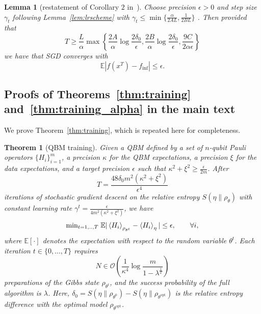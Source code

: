 \documentclass[
    aps,
    prx,
    onecolumn
]{revtex4-2}
\newtheorem{theorem}{Theorem}
\newtheorem{lemma}{Lemma}
\begin{document}
\begin{lemma}[restatement of Corollary $2$ in~\cite{Khaled2020}]
\label{lem:sgd_conv_2}
Choose precision $\epsilon > 0$ and step size $\gamma_t$ following Lemma~\ref{lem:lrscheme} with $\gamma_t\leq \min \{\frac{\alpha}{2AL}, \frac{1}{2BL}\}$ . Then provided that 
\begin{equation}
\label{eq:condition_1}
T \geq \frac{L}{\alpha} \max \left\{ \frac{2A}{\alpha}\log{\frac{2\delta_0}{\epsilon}}, \frac{2B}{\alpha}\log{\frac{2\delta_0}{\epsilon}}, \frac{9C}{2\alpha \epsilon} \right\}
\end{equation} 
we have that SGD converges with 
\begin{equation}
 \mathbb{E} |f(x^T)-f_{\mathrm{inf}} | \leq \epsilon .
\end{equation}
\end{lemma}


\subsection{Proofs of Theorems~\ref{thm:training} and~\ref{thm:training_alpha} in the main text}
\label{app:proofsthm12}

We prove Theorem~\ref{thm:training}, which is repeated here for completeness. 

\begingroup
\def\thetheorem{1}
\begin{theorem}[QBM training]
Given a QBM defined by a set of $n$-qubit Pauli operators $\{H_i\}_{i=1}^m$, a precision $\kappa$ for the QBM expectations, a precision $\xi$ for the data expectations, and a target precision $\epsilon$ such that $\kappa^2 + \xi^2 \geq \frac{\epsilon}{2m}$. After 
\begin{equation}
    T = \frac{48\delta_0 m^2  (\kappa^2 + \xi^2 )}{\epsilon^4}
\end{equation} 
iterations of stochastic gradient descent on the relative entropy $S(\eta \|\rho_\theta)$ with constant learning rate $\gamma^t=\frac{\epsilon}{4m^2(\kappa^2+\xi^2)}$, we have
\begin{equation}
    \mathrm{min}_{t=1,..,T} \; \mathbb{E}| \expval{H_i}_{\rho_{\theta^t}}  - \expval{H_i}_\eta | \leq \epsilon, \qquad \forall i,
\end{equation} where $\mathbb{E}[\cdot]$ denotes the expectation with respect to the random variable $\theta^t$. 
Each iteration $t \in \{0, \dots, T\}$ requires
\begin{equation}
\label{eq:copies_app}
    N \in \mathcal{O} \left( \frac{1}{{\kappa^4}} \log \frac{ m} { 1-\lambda^{\frac{1}{T}} } \right)
\end{equation}
preparations of the Gibbs state $\rho_{\theta^t}$, and the success probability of the full algorithm is $\lambda$. Here, $\delta_0 = S(\eta\|\rho_{\theta^0})-S(\eta\|\rho_{\theta^\mathrm{opt}})$ is the relative entropy difference with the optimal model $\rho_{\theta^\mathrm{opt}}$.
\end{theorem}
\addtocounter{theorem}{-1}
\endgroup
\end{document}

